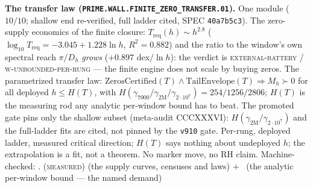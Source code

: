 \documentclass[11pt,a4paper]{article}
\theoremstyle{definition}
\begin{document}
\par\smallskip\noindent\textbf{The transfer law
(\texttt{PRIME.WALL.FINITE\_ZERO\_\allowbreak TRANSFER.01}).}
One module ($10/10$; shallow end re-verified, full ladder
cited, SPEC \texttt{40a7b5c3}).  The zero-supply economics of
the finite closure: $T_{\mathrm{req}}(h) \sim h^{2.8}$
($\log_{10} T_{\mathrm{req}} = -3.045 + 1.228 \ln h$, $R^2 =
0.882$) and the ratio to the window's own spectral reach
$\pi/D_h$ \emph{grows} ($+0.897$ dex$/\ln h$): the verdict is
\textsc{external-battery} / \textsc{w-unbounded-per-rung} ---
the finite engine does not scale by buying zeros.  The
parametrized transfer law:
$\mathrm{ZerosCertified}(T) \wedge \mathrm{TailEnvelope}(T)
\Rightarrow M_h \succ 0$ for all deployed $h \le H(T)$, with
$H(\gamma_{7000}/\gamma_{2\mathrm{M}}/\gamma_{2\cdot10^{7}}) =
254/1256/2806$; $H(T)$ is the measuring rod any analytic
per-window bound has to beat.  The promoted gate pins only the
shallow subset (meta-audit CCCXXXVI):
$H(\gamma_{2\mathrm{M}}/\gamma_{2\cdot10^{7}})$ and the
full-ladder fits are cited, not pinned by the \texttt{v910}
gate.  Per-rung, deployed ladder,
measured critical direction; $H(T)$ says nothing about
undeployed $h$; the extrapolation is a fit, not a theorem.  No
marker move, no RH claim.
Machine-checked: .
(\textsc{measured}) (the supply curves, censuses and laws) $+$
\mO\ (the analytic per-window bound --- the named demand)
\par\smallskip
\end{document}
